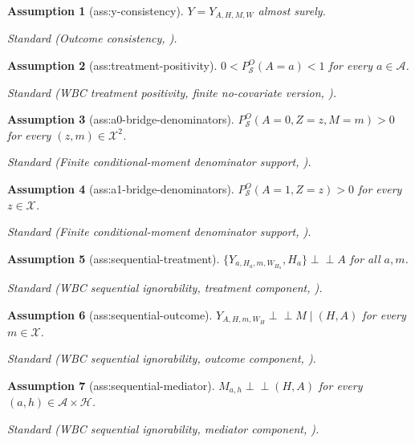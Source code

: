 \documentclass{article}
\newtheorem{assumption}{Assumption}
\begin{document}
\begin{assumption}[ass:y-consistency]\label{ass:y-consistency}
\(Y=Y_{A,H,M,W}\) almost surely.
\par\smallskip\noindent\emph{Standard} (Outcome consistency, \cite{WuBaiCui2026}).
\end{assumption}

\begin{assumption}[ass:treatment-positivity]\label{ass:treatment-positivity}
\(0<P_{\mathcal S}^O(A=a)<1\) for every \(a\in\mathcal A\).
\par\smallskip\noindent\emph{Standard} (WBC treatment positivity, finite no-covariate version, \cite{WuBaiCui2026}).
\end{assumption}

\begin{assumption}[ass:a0-bridge-denominators]\label{ass:a0-bridge-denominators}
\(P_{\mathcal S}^O(A=0,Z=z,M=m)>0\) for every \((z,m)\in\mathcal X^2\).
\par\smallskip\noindent\emph{Standard} (Finite conditional-moment denominator support, \cite{ZhangLiMiaoTchetgen2023}).
\end{assumption}

\begin{assumption}[ass:a1-bridge-denominators]\label{ass:a1-bridge-denominators}
\(P_{\mathcal S}^O(A=1,Z=z)>0\) for every \(z\in\mathcal X\).
\par\smallskip\noindent\emph{Standard} (Finite conditional-moment denominator support, \cite{ZhangLiMiaoTchetgen2023}).
\end{assumption}

\begin{assumption}[ass:sequential-treatment]\label{ass:sequential-treatment}
\(\{Y_{a,H_a,m,W_{H_a}},H_a\}\mathbin{\perp\!\!\!\perp}A\) for all \(a,m\).
\par\smallskip\noindent\emph{Standard} (WBC sequential ignorability, treatment component, \cite{WuBaiCui2026}).
\end{assumption}

\begin{assumption}[ass:sequential-outcome]\label{ass:sequential-outcome}
\(Y_{A,H,m,W_H}\mathbin{\perp\!\!\!\perp}M\mid(H,A)\) for every \(m\in\mathcal X\).
\par\smallskip\noindent\emph{Standard} (WBC sequential ignorability, outcome component, \cite{WuBaiCui2026}).
\end{assumption}

\begin{assumption}[ass:sequential-mediator]\label{ass:sequential-mediator}
\(M_{a,h}\mathbin{\perp\!\!\!\perp}(H,A)\) for every \((a,h)\in\mathcal A\times\mathcal H\).
\par\smallskip\noindent\emph{Standard} (WBC sequential ignorability, mediator component, \cite{WuBaiCui2026}).
\end{assumption}
\end{document}
